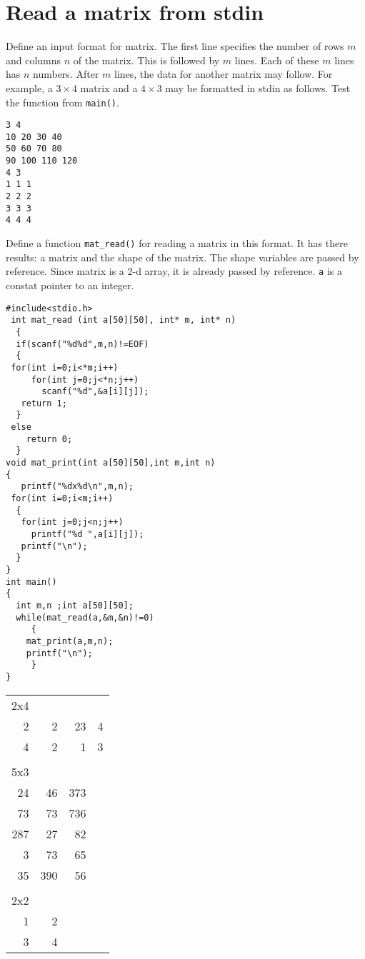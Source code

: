 \documentclass[11pt]{article}
\begin{document}
\section{Read a matrix from stdin}
\label{sec-3}
Define an input format for matrix. The first line
specifies the number of rows $m$ and columns $n$ of the
matrix. This is followed by $m$ lines. Each of these $m$
lines has $n$ numbers. After $m$ lines, the data for
another matrix may follow. For example, a $3 \times 4$
matrix and a $4 \times 3$ may be formatted in stdin as
follows. Test the function from \texttt{main()}.
\linespread{1}
\begin{verbatim}
3 4
10 20 30 40
50 60 70 80
90 100 110 120
4 3
1 1 1
2 2 2
3 3 3
4 4 4
\end{verbatim}
\linespread{1.2}
Define a function \texttt{mat\_read()} for reading a matrix in
this format. It has there results: a matrix and the shape
of the matrix. The shape variables are passed by
reference. Since matrix is a 2-d array, it is already
passed by reference. \texttt{a} is a constat pointer to an
integer.
\linespread{1}
\begin{verbatim}
#include<stdio.h>
 int mat_read (int a[50][50], int* m, int* n)
  {
  if(scanf("%d%d",m,n)!=EOF)
  {
 for(int i=0;i<*m;i++)
     for(int j=0;j<*n;j++)
       scanf("%d",&a[i][j]);
   return 1;
  }
 else
    return 0;
  }
void mat_print(int a[50][50],int m,int n)
{
   printf("%dx%d\n",m,n);
 for(int i=0;i<m;i++)
  {
   for(int j=0;j<n;j++)
     printf("%d ",a[i][j]);
   printf("\n");
  }
}
int main()
{
  int m,n ;int a[50][50];
  while(mat_read(a,&m,&n)!=0)
     {
	mat_print(a,m,n);
	printf("\n");
     }
}
\end{verbatim}

\begin{center}
\begin{tabular}{rrrr}
2x4 &  &  & \\
2 & 2 & 23 & 4\\
4 & 2 & 1 & 3\\
 &  &  & \\
5x3 &  &  & \\
24 & 46 & 373 & \\
73 & 73 & 736 & \\
287 & 27 & 82 & \\
3 & 73 & 65 & \\
35 & 390 & 56 & \\
 &  &  & \\
2x2 &  &  & \\
1 & 2 &  & \\
3 & 4 &  & \\
\end{tabular}
\end{center}
\end{document}

